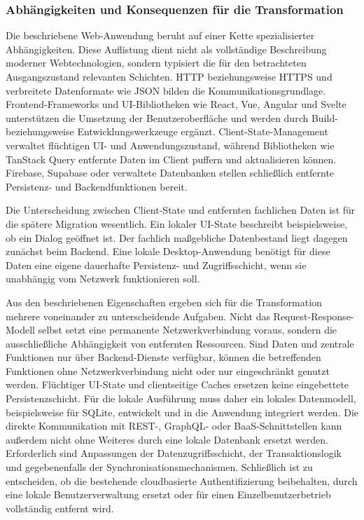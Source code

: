 \subsubsection{Abhängigkeiten und Konsequenzen für die Transformation}
Die beschriebene Web-Anwendung beruht auf einer Kette spezialisierter Abhängigkeiten.
Diese Auflistung dient nicht als vollständige Beschreibung moderner Webtechnologien, sondern typisiert die für den betrachteten Ausgangszustand relevanten Schichten.
HTTP beziehungsweise HTTPS und verbreitete Datenformate wie JSON bilden die Kommunikationsgrundlage.
Frontend-Frameworks und UI-Bibliotheken wie React, Vue, Angular und Svelte unterstützen die Umsetzung der Benutzeroberfläche und werden durch Build- beziehungsweise Entwicklungswerkzeuge ergänzt.
Client-State-Management verwaltet flüchtigen UI- und Anwendungszustand, während Bibliotheken wie TanStack Query entfernte Daten im Client puffern und aktualisieren können.
Firebase, Supabase oder verwaltete Datenbanken stellen schließlich entfernte Persistenz- und Backendfunktionen bereit.

Die Unterscheidung zwischen Client-State und entfernten fachlichen Daten ist für die spätere Migration wesentlich.
Ein lokaler UI-State beschreibt beispielsweise, ob ein Dialog geöffnet ist.
Der fachlich maßgebliche Datenbestand liegt dagegen zunächst beim Backend.
Eine lokale Desktop-Anwendung benötigt für diese Daten eine eigene dauerhafte Persistenz- und Zugriffsschicht, wenn sie unabhängig vom Netzwerk funktionieren soll.

Aus den beschriebenen Eigenschaften ergeben sich für die Transformation mehrere voneinander zu unterscheidende Aufgaben.
Nicht das Request-Response-Modell selbst setzt eine permanente Netzwerkverbindung voraus, sondern die ausschließliche Abhängigkeit von entfernten Ressourcen.
Sind Daten und zentrale Funktionen nur über Backend-Dienste verfügbar, können die betreffenden Funktionen ohne Netzwerkverbindung nicht oder nur eingeschränkt genutzt werden.
Flüchtiger UI-State und clientseitige Caches ersetzen keine eingebettete Persistenzschicht.
Für die lokale Ausführung muss daher ein lokales Datenmodell, beispielsweise für SQLite, entwickelt und in die Anwendung integriert werden.
Die direkte Kommunikation mit REST-, GraphQL- oder BaaS-Schnittstellen kann außerdem nicht ohne Weiteres durch eine lokale Datenbank ersetzt werden.
Erforderlich sind Anpassungen der Datenzugriffsschicht, der Transaktionslogik und gegebenenfalls der Synchronisationsmechanismen.
Schließlich ist zu entscheiden, ob die bestehende cloudbasierte Authentifizierung beibehalten, durch eine lokale Benutzerverwaltung ersetzt oder für einen Einzelbenutzerbetrieb vollständig entfernt wird.

